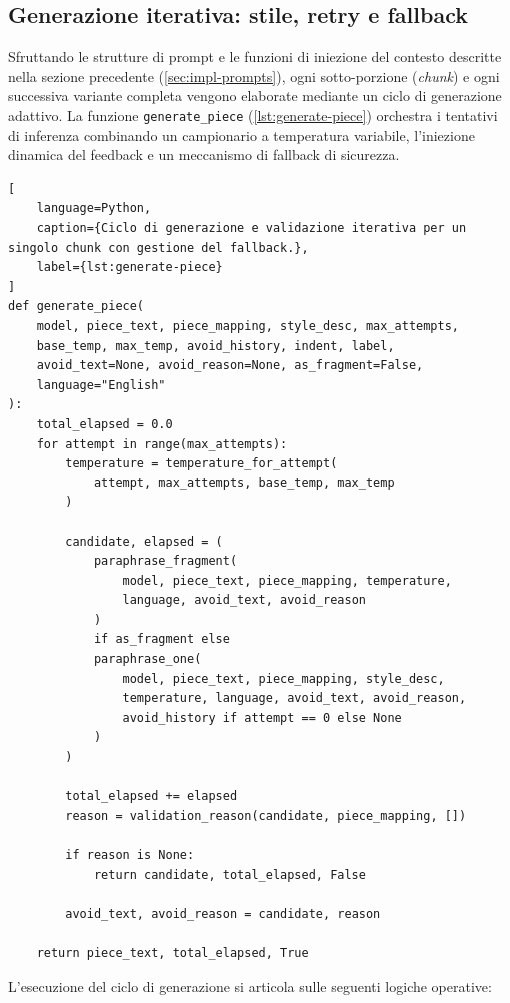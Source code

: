 \documentclass[12pt,a4paper,openright,twoside]{book}
\begin{document}
\subsection{Generazione iterativa: stile, retry e fallback}
\label{sec:impl-generation}

Sfruttando le strutture di prompt e le funzioni di iniezione del contesto
descritte nella sezione precedente (\cref{sec:impl-prompts}), ogni
sotto-porzione (\textit{chunk}) e ogni successiva variante completa vengono
elaborate mediante un ciclo di generazione adattivo. La funzione
\texttt{generate\_piece} (\cref{lst:generate-piece}) orchestra i tentativi di
inferenza combinando un campionario a temperatura variabile, l'iniezione
dinamica del feedback e un meccanismo di fallback di sicurezza.

\begin{lstlisting}[
    language=Python,
    caption={Ciclo di generazione e validazione iterativa per un singolo chunk con gestione del fallback.},
    label={lst:generate-piece}
]
def generate_piece(
    model, piece_text, piece_mapping, style_desc, max_attempts,
    base_temp, max_temp, avoid_history, indent, label,
    avoid_text=None, avoid_reason=None, as_fragment=False,
    language="English"
):
    total_elapsed = 0.0
    for attempt in range(max_attempts):
        temperature = temperature_for_attempt(
            attempt, max_attempts, base_temp, max_temp
        )
        
        candidate, elapsed = (
            paraphrase_fragment(
                model, piece_text, piece_mapping, temperature, 
                language, avoid_text, avoid_reason
            )
            if as_fragment else
            paraphrase_one(
                model, piece_text, piece_mapping, style_desc,
                temperature, language, avoid_text, avoid_reason,
                avoid_history if attempt == 0 else None
            )
        )
        
        total_elapsed += elapsed
        reason = validation_reason(candidate, piece_mapping, [])
        
        if reason is None:
            return candidate, total_elapsed, False
            
        avoid_text, avoid_reason = candidate, reason
        
    return piece_text, total_elapsed, True
\end{lstlisting}

L'esecuzione del ciclo di generazione si articola sulle seguenti logiche
operative:
\end{document}
